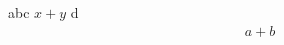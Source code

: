 \documentclass{article}
\begin{document}
abc $x+y$ d
\begin{align}
a + b
\end{align}
\end{document}
